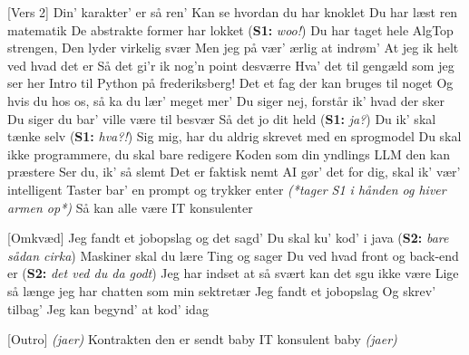 \documentclass[a4paper, 11pt]{article}
\begin{document}
\begin{song}
[Vers 2] Din’ karakter’ er så ren’ 
Kan se hvordan du har knoklet 
Du har læst ren matematik
De abstrakte former har lokket (\textbf{S1:} \textit{woo!})
Du har taget hele AlgTop strengen, 
Den lyder virkelig svær 
Men jeg på vær’ ærlig at indrøm’
At jeg ik helt ved hvad det er
Så det gi’r ik nog’n point desværre
Hva' det til gengæld som jeg ser her 
Intro til Python på frederiksberg!
Det et fag der kan bruges til noget 
Og hvis du hos os, så ka du lær’ meget mer’
Du siger nej, forstår ik' hvad der sker 
Du siger du bar' ville være til besvær 
Så det jo dit held (\textbf{S1:} \textit{ja?}) 
Du ik' skal tænke selv (\textbf{S1:} \textit{hva?!})
Sig mig, har du aldrig skrevet med en sprogmodel
Du skal ikke programmere, du skal bare redigere
Koden som din yndlings LLM den kan præstere 
Ser du, ik' så slemt
Det er faktisk nemt    
AI gør' det for dig, skal ik' vær' intelligent
Taster bar' en prompt og trykker enter
\textit{(*tager S1 i hånden og hiver armen op*)}
Så kan alle være IT konsulenter


[Omkvæd]
Jeg fandt et jobopslag 
og det sagd’ 
Du skal ku’ kod’ i java (\textbf{S2:} \textit{bare sådan cirka})
Maskiner skal du lære
Ting og sager
Du ved hvad front og back-end er 
(\textbf{S2:} \textit{det ved du da godt})
Jeg har indset at så svært kan det sgu ikke være 
Lige så længe jeg har chatten som min sektretær 
Jeg fandt et jobopslag
Og skrev’ tilbag’
Jeg kan begynd' at kod' idag

[Outro] \textit{(jaer)} 
Kontrakten den er sendt baby
IT konsulent baby 
\textit{(jaer)}  


\end{song}
\end{document}
